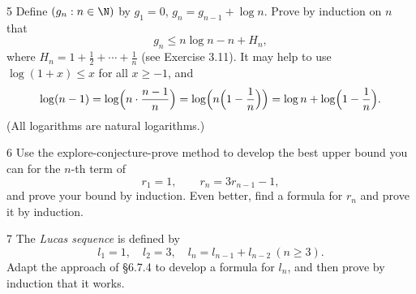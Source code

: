\begin{exercise}{5}
    Define $(g_n:n\in\N)$ by $g_1=0$, $g_n=g_{n-1}+\log n$. Prove by induction on
    $n$ that
    \[
        g_n\le n\log n-n+H_n,
    \]
    where $H_n=1+\frac12+\cdots+\frac1n$ (see Exercise 3.11). It may help to use
    $\log(1+x)\le x$ for all $x\ge-1$, and
    \[
        \log(n-1)=\log\Bigl(n\cdot\frac{n-1}{n}\Bigr)
        =\log\Bigl(n\Bigl(1-\frac1n\Bigr)\Bigr)
        =\log n+\log\Bigl(1-\frac1n\Bigr).
    \]
    (All logarithms are natural logarithms.)
\end{exercise}

\begin{exercise}{6}
    Use the explore-conjecture-prove method to develop the best upper bound you
    can for the $n$-th term of
    \[
        r_1=1,\qquad r_n=3r_{n-1}-1,
    \]
    and prove your bound by induction. Even better, find a formula for $r_n$ and
    prove it by induction.
\end{exercise}

\begin{exercise}{7}
    The \emph{Lucas sequence} is defined by
    \[
        l_1=1,\quad l_2=3,\quad l_n=l_{n-1}+l_{n-2}\ (n\ge3).
    \]
    Adapt the approach of \S6.7.4 to develop a formula for $l_n$, and then prove
    by induction that it works.
\end{exercise}

